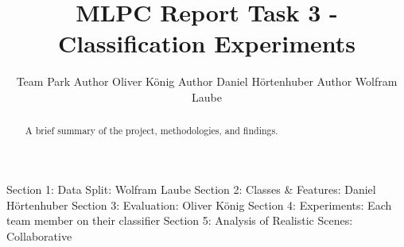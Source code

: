 \documentclass{article}
\title{MLPC Report Task 3 - Classification Experiments}
\author{%
  Team Park \And
  Author Oliver König \And
  Author Daniel Hörtenhuber \And
  Author Wolfram Laube
}
\begin{document}
\maketitle

\begin{abstract}
A brief summary of the project, methodologies, and findings.
\end{abstract}

\begin{contributions}
  Section 1: Data Split: Wolfram Laube \AND
  Section 2: Classes & Features: Daniel Hörtenhuber \AND
  Section 3: Evaluation: Oliver König \AND
  Section 4: Experiments: Each team member on their classifier \AND
  Section 5: Analysis of Realistic Scenes: Collaborative
\end{contributions}







\end{document}
